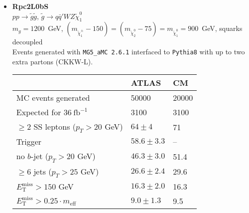 \documentclass[10pt,fleqn]{article}
\newcommand{\met}{E^\mathrm{miss}_\mathrm{T}}
\newcommand{\meff}{m_\mathrm{eff}}
\begin{document}
\begin{itemize}
\item \textbf{Rpc2L0bS}\\ $ p p \to \tilde{g} \tilde{g} $, $\tilde{g} \to q \bar{q}' W Z \tilde{\chi}_1^0$\\
 $m_{g} = 1200$~GeV, $(m_{\tilde{\chi}_1^\pm} - 150) = (m_{\tilde{\chi}_2^0} - 75) = m_{\tilde{\chi}_1^0} = 900$~GeV, squarks decoupled\\
 Events generated with \texttt{MG5\_aMC 2.6.1} interfaced to \texttt{Pythia8} with up to two extra partons (CKKW-L).
 \begin{tabular}{l|p{3cm}|p{3cm}} \toprule
                                           &  ATLAS           & CM  \\ \midrule
 MC events generated                       &  50000           & 20000 \\ \midrule
 Expected for $36\ \mathrm{fb}^{-1}$       &  3100           & 3100  \\
 $\geq 2$ SS leptons ($p_T > 20$ GeV)      & $64\pm 4$      & 71  \\
 Trigger                                   & $58.6\pm 3.3$  &  --\\
 no $b$-jet ($p_T > 20$ GeV)               & $46.3\pm 3.0$  & 51.4 \\
 $\geq 6$ jets ($p_T > 25$ GeV)            & $26.6\pm 2.4$  & 29.6 \\
 $\met  > 150$ GeV                         & $16.3\pm 2.0$  & 16.3 \\
 $\met > 0.25\cdot \meff$                  & $9.0 \pm 1.3$  & 9.5 \\   \bottomrule
 \end{tabular}   
 

\end{itemize}
\end{document}
